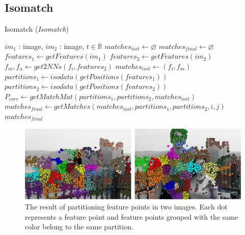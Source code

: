 \subsection{Isomatch}

\begin{algorithm}[h]
\caption{Isomatch (\emph{Isomatch})}
\label{alg-isomatch}
\begin{algorithmic}
\Require $im_1$ : image, $im_2$ : image, $t \in \mathbb{R}$
\State $matches_{init}\gets \varnothing$
\State $matches_{final}\gets \varnothing$
\State $features_1 \gets getFeatures(im_1)$
\State $features_2 \gets getFeatures(im_2)$
    \State $f_m,f_n \gets get2NNs(f_i, features_2)$
    \State $matches_{init} \gets \left(f_i, f_m\right)$
\EndFor
\State $partitions_1 \gets isodata(getPositions(features_1))$
\State $partitions_2 \gets isodata(getPositions(features_2))$
\State $P_{corr} \gets getMatchMat(partitions_1, partitions_2, 
matches_{init})$
        \State $matches_{final} \gets getMatches(matches_{init}, 
        partitions_1, partitions_2, i, j)$
    \EndIf
\EndFor
\Return $matches_{final}$
\end{algorithmic}
\end{algorithm}

\begin{figure}[htb]
	\centering
	\includegraphics[width=\columnwidth]{images/isomatch_partitions}
	\caption{The result of partitioning feature points in two images.  
	Each dot represents a feature point and feature points grouped with 
the same color belong to the same partition.}
	\label{fig:isomatch_partitions}
\end{figure}

